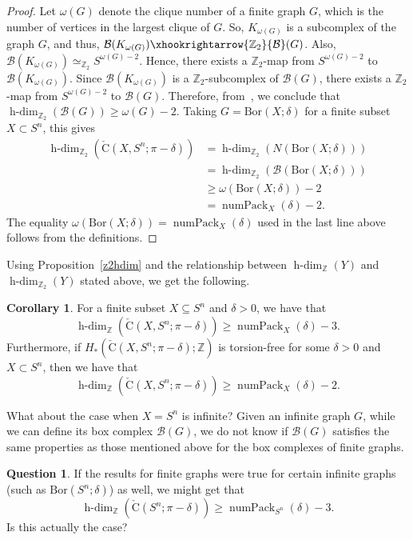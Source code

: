 \documentclass[11 pt,a4paper,twoside,reqno]{amsart}
\theoremstyle{definition}
\newtheorem{corollary}[theorem]{Corollary}
\newtheorem{question}[theorem]{Question}
\def\Z{{\mathbb Z}}
\def\cB{{\mathcal B}}
\newcommand{\cech}[2]{\mathrm{\check{C}}(#1;#2)}
\newcommand{\acech}[3]{\mathrm{\check{C}}(#1,#2;#3)}
\DeclareMathOperator{\numpack}{numPack}
\newcommand{\bor}[2]{\mathrm{Bor}(#1;#2)}
\DeclareMathOperator{\hdim}{h-dim}
\begin{document}
\begin{proof}
Let $\omega(G)$ denote the clique number of a finite graph $G$, which is the number of vertices in the largest clique of $G$.
So, $K_{\omega(G)}$ is a subcomplex of the graph $G$, and thus, $\cB(K_{\omega(G)})\xhookrightarrow{\Z_2} \cB(G)$.
Also, $\cB(K_{\omega(G)})\simeq_{\Z_2}S^{\omega(G)-2}$.
Hence, there exists a $\Z_2$-map from $S^{\omega(G)-2}$ to $\cB(K_{\omega(G)})$.
Since $\cB(K_{\omega(G)})$ is a $\Z_2$-subcomplex of $\cB(G)$, there exists a $\Z_2$-map from $S^{\omega(G)-2}$ to $\cB(G)$.
Therefore, from~\cite[Lemma~4.4]{MatsushitaWakatsuki}, we conclude that $\hdim_{\Z_2}(\cB(G))\ge \omega(G)-2$.
Taking $G=\bor{X}{\delta}$ for a finite subset $X\subset S^n$, this gives 
\begin{align*}
\hdim_{\Z_2}(\acech{X}{S^n}{\pi-\delta})
&= \hdim_{\Z_2}(N(\bor{X}{\delta})) \\
&= \hdim_{\Z_2}(\cB(\bor{X}{\delta})) \\
&\ge \omega(\bor{X}{\delta})-2 \\
&= \numpack_{X}(\delta)-2.
\end{align*}
The equality $\omega(\bor{X}{\delta}) = \numpack_X(\delta)$ used in the last line above follows from the definitions.
\end{proof}

Using Proposition~\ref{z2hdim} and the relationship between $\hdim_{\Z}(Y)$ and $\hdim_{\Z_2}(Y)$ stated above, we get the following.

\begin{corollary}\label{zhdim}
For a finite subset $X\subseteq S^n$ and $\delta > 0$, we have that
\[
\hdim_{\Z}(\acech{X}{S^n}{\pi-\delta}) \geq \numpack_{X}(\delta)-3.
\]
Furthermore, if $H_*(\acech{X}{S^n}{\pi-\delta};\Z)$ is torsion-free for some $\delta>0$ and $X\subset S^n$, then we have that
\[
\hdim_{\Z}(\acech{X}{S^n}{\pi-\delta}) \geq \numpack_{X}(\delta)-2.
\]
\end{corollary}

What about the case when $X=S^n$ is infinite?
Given an infinite graph $G$, while we can define its box complex $\cB(G)$, we do not know if $\cB(G)$ satisfies the same properties as those mentioned above for the box complexes of finite graphs.

\begin{question}
\label{ques:lower-bound-hdim}
If the results for finite graphs were true for certain infinite graphs (such as $\bor{S^n}{\delta}$) as well, we might get that 
\begin{equation}
\label{eq:h-dimMatsushita}
\hdim_{\Z}(\cech{S^n}{\pi-\delta}) \ge \numpack_{S^n}(\delta)-3.
\end{equation}
Is this actually the case? 
\end{question}
\end{document}
